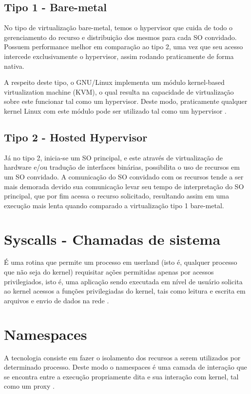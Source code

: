 \subsection{Tipo 1 - Bare-metal}
No tipo de virtualização bare-metal, temos o hypervisor que cuida de todo o gerenciamento do recurso e distribuição dos mesmos para cada SO convidado. Possuem performance melhor em comparação ao tipo 2, uma vez que seu acesso intercede exclusivamente o hypervisor, assim rodando praticamente de forma nativa.

A respeito deste tipo, o GNU/Linux implementa um módulo kernel-based virtualization machine (KVM), o qual resulta na capacidade de virtualização sobre este funcionar tal como um hypervisor. Deste modo, praticamente qualquer kernel Linux com este módulo pode ser utilizado tal como um hypervisor \cite{what-is-KVM}.

\subsection{Tipo 2 - Hosted Hypervisor}
Já no tipo 2, inicia-se um SO principal, e este através de virtualização de hardware e/ou tradução de interfaces binárias, possibilita o uso de recursos em um SO convidado. A comunicação do SO convidado com os recursos tende a ser mais demorada devido sua comunicação levar seu tempo de interpretação do SO principal, que por fim acessa o recurso solicitado, resultando assim em uma execução mais lenta quando comparado a virtualização tipo 1 bare-metal.

\section{Syscalls - Chamadas de sistema}
\label{chp:referencial_teorico::sct:syscall}
É uma rotina que permite um processo em userland (isto é, qualquer processo que não seja do kernel) requisitar ações permitidas apenas por acessos privilegiados, isto é, uma aplicação sendo executada em nível de usuário solicita ao kernel acessos a funções privilegiadas do kernel, tais como leitura e escrita em arquivos e envio de dados na rede \cite{syscall-ibm, syscall-kerrisk}.

\section{Namespaces}
\label{chp:referencial_teorico::sct:namespace}
A tecnologia consiste em fazer o isolamento dos recursos a serem utilizados por determinado processo. Deste modo o namespaces é uma camada de interação que se encontra entre a execução propriamente dita e sua interação com kernel, tal como um proxy \cite{kernelscheepers}.

